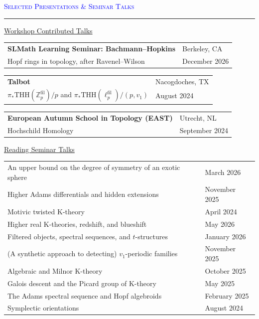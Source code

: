 \documentclass[10pt]{article}
\makeatletter
\newcommand{\grey}[1]{\textcolor{cvgrey}{#1}}
\newcommand{\altarray}[1]{
    \begin{tabular}{>{\raggedright\arraybackslash}p{13cm} @{\hskip 1cm} >{\raggedleft\arraybackslash}p{3.25cm}}
    #1
    \end{tabular}
}
\newenvironment{rSection}[1]{ %
  \medskip
  {\large\scshape\textcolor{Blue}{#1}} %
  \smallskip
  \hrule %
  \begin{list}{}{ %
    \setlength{\leftmargin}{0em} %
  }
  \item[]
}{
  \end{list}
}
\makeatother
\begin{document}
\begin{rSection}{Selected Presentations \& Seminar Talks}
\underline{Workshop Contributed Talks}

\altarray{
    \textbf{SLMath Learning Seminar: Bachmann--Hopkins} & \footnotesize Berkeley, CA \\
    \grey{Hopf rings in topology, after Ravenel--Wilson} & \footnotesize \grey{December 2026}
}
\altarray{
    \textbf{Talbot} & \footnotesize Nacogdoches, TX\\
    \grey{$\pi_*\text{THH}(\mathbb{Z}_p^\text{fil})/p$ and $\pi_*\text{THH}(\ell^\text{fil}_p)/(p, v_1)$} & \footnotesize \grey{August 2024}
}
\altarray{
    \textbf{European Autumn School in Topology (EAST)} & \footnotesize Utrecht, NL\\
    \grey{Hochschild Homology} & \footnotesize \grey{September 2024}
}



\underline{Reading Seminar Talks}
\altarray{
\grey{An upper bound on the degree of symmetry of an exotic sphere} & \footnotesize \grey{March 2026}\\
\grey{Higher Adams differentials and hidden extensions} & \footnotesize \grey{November 2025}\\
\grey{Motivic twisted K-theory} & \footnotesize \grey{April 2024}\\
    \grey{Higher real K-theories, redshift, and blueshift} & \footnotesize \grey{May 2026}\\
    \grey{Filtered objects, spectral sequences, and $t$-structures} & \footnotesize \grey{January 2026} \\
    \grey{(A synthetic approach to detecting) $v_1$-periodic families} & \footnotesize \grey{November 2025}\\
    \grey{Algebraic and Milnor K-theory} & \footnotesize \grey{October 2025}\\
    \grey{Galois descent and the Picard group of K-theory} & \footnotesize \grey{May 2025}\\
    \grey{The Adams spectral sequence and Hopf algebroids} & \footnotesize \grey{February 2025}\\
    \grey{Symplectic orientations} & \footnotesize \grey{August 2024}
}


\end{rSection}





\end{document}
